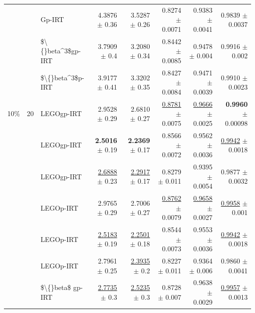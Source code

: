 \begin{longtable}{llp{}rrrrr}
 &  & Gp-IRT & 4.3876 {\scriptsize $\pm$ 0.36} & 3.5287 {\scriptsize $\pm$ 0.26} & 0.8274 {\scriptsize $\pm$ 0.0071} & 0.9383 {\scriptsize $\pm$ 0.0041} & 0.9839 {\scriptsize $\pm$ 0.0037} \\
 &  & \$\textbackslash\{\}beta\textasciicircum{}3\$gp-IRT & 3.7909 {\scriptsize $\pm$ 0.4} & 3.2080 {\scriptsize $\pm$ 0.34} & 0.8442 {\scriptsize $\pm$ 0.0085} & 0.9478 {\scriptsize $\pm$ 0.004} & 0.9916 {\scriptsize $\pm$ 0.002} \\
 &  & \$\textbackslash\{\}beta\textasciicircum{}3\$p-IRT & 3.9177 {\scriptsize $\pm$ 0.41} & 3.3202 {\scriptsize $\pm$ 0.35} & 0.8427 {\scriptsize $\pm$ 0.0084} & 0.9471 {\scriptsize $\pm$ 0.0039} & 0.9910 {\scriptsize $\pm$ 0.0023} \\
\midrule
10\% & 20 & LEGOgp-IRT & 2.9528 {\scriptsize $\pm$ 0.29} & 2.6810 {\scriptsize $\pm$ 0.27} & \underline{0.8781} {\scriptsize $\pm$ 0.0075} & \underline{0.9666} {\scriptsize $\pm$ 0.0025} & \textbf{0.9960} {\scriptsize $\pm$ 0.00098} \\
 &  & LEGOgp-IRT & \textbf{2.5016} {\scriptsize $\pm$ 0.19} & \textbf{2.2369} {\scriptsize $\pm$ 0.17} & 0.8566 {\scriptsize $\pm$ 0.0072} & 0.9562 {\scriptsize $\pm$ 0.0036} & \underline{0.9942} {\scriptsize $\pm$ 0.0018} \\
 &  & LEGOgp-IRT & \underline{2.6888} {\scriptsize $\pm$ 0.23} & \underline{2.2917} {\scriptsize $\pm$ 0.17} & 0.8279 {\scriptsize $\pm$ 0.011} & 0.9395 {\scriptsize $\pm$ 0.0054} & 0.9877 {\scriptsize $\pm$ 0.0032} \\
 &  & LEGOp-IRT & 2.9765 {\scriptsize $\pm$ 0.29} & 2.7006 {\scriptsize $\pm$ 0.27} & \underline{0.8762} {\scriptsize $\pm$ 0.0079} & \underline{0.9658} {\scriptsize $\pm$ 0.0027} & \underline{0.9958} {\scriptsize $\pm$ 0.001} \\
 &  & LEGOp-IRT & \underline{2.5183} {\scriptsize $\pm$ 0.19} & \underline{2.2501} {\scriptsize $\pm$ 0.18} & 0.8544 {\scriptsize $\pm$ 0.0073} & 0.9553 {\scriptsize $\pm$ 0.0036} & \underline{0.9942} {\scriptsize $\pm$ 0.0018} \\
 &  & LEGOp-IRT & 2.7961 {\scriptsize $\pm$ 0.25} & \underline{2.3935} {\scriptsize $\pm$ 0.2} & 0.8227 {\scriptsize $\pm$ 0.011} & 0.9364 {\scriptsize $\pm$ 0.006} & 0.9860 {\scriptsize $\pm$ 0.0041} \\
 &  & \$\textbackslash\{\}beta\$ gp-IRT & \underline{2.7735} {\scriptsize $\pm$ 0.3} & \underline{2.5235} {\scriptsize $\pm$ 0.3} & 0.8728 {\scriptsize $\pm$ 0.007} & 0.9638 {\scriptsize $\pm$ 0.0029} & \underline{0.9957} {\scriptsize $\pm$ 0.0013} \\

\end{longtable}
